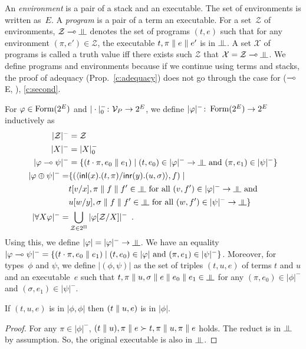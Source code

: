 An \textit{environment} is a pair of a stack and an executable.
The set of environments is written as~$E$.
A \textit{program} is a pair of a term an executable.
For a set~$\mathcal Z$ of environments, $\mathcal Z\limp\bbot$ denotes
the set of programs $(t,e)$ such that
for any environment $(\pi,e')\in \mathcal Z$,
the executable $t,\pi\parallel e \parallel e'$ is in $\bbot$.
A set $\mathcal X$ of programs is called a truth value
iff there exists
such $\mathcal Z$ that $\mathcal X = \mathcal Z\limp \bbot$.
We define programs and environments because if we continue using
terms and stacks, the proof of adequacy (Prop.~\ref{c:adequacy}) does
not go through the case for
($\multimap$E, \textminus), \ref{c:second}.

\renewcommand{\sem}[1]{|{#1}|}
\newcommand{\nsem}[1]{\sem{#1}^-}
\newcommand{\sempair}[1]{\sem{(#1)}}
For $\varphi\in\mathop{\text{Form}}(2^E)$ and $|\cdot|^-_0\colon\mathcal V_P\rightarrow 2^E$,
we define $\nsem{\phi}\colon \form(2^E)\rightarrow
2^E$ inductively as
\begin{align*}
 \nsem{\mathcal Z} &= \mathcal Z \\
 \nsem{X}&= |X|_0^- \\
 \nsem{\phi\limp\psi}&=
 \{(t\cdot\pi, e_0\conc e_1)\mid
 (t,e_0)\in\nsem\phi\rightarrow\bbot \text{ and }(\pi,e_1)\in\nsem\psi\}\\
 \nsem{\phi\oplus\psi}=& \{(\mats x{t}{\pi}y{u}{\sigma}, f)\mid\\ &
 t[v/x],\pi\conc f\conc f'\in\bbot \text{ for all } (v,f')\in\nsem{\phi}\rightarrow\bbot\text{
 and }\\ &
 u[w/y],\sigma\conc f\conc f'\in\bbot \text{ for all } (w,f')\in\nsem{\psi}\rightarrow\bbot\}
 \\
 \nsem{\forall X\phi}=&
 \bigcup_{\mathcal Z\in 2^\Pi} \nsem{\phi[\mathcal Z/X]}\enspace.
\end{align*}
Using this, we define $\sem \phi=\nsem{\phi}\rightarrow\bbot$.
We have an equality
$\nsem{\phi\limp\psi} = \{(t\cdot\pi, e_0\conc e_1)\mid
(t,e_0)\in\sem\phi\text{ and }(\pi,e_1)\in\nsem\psi\}$.
Moreover, for types~$\phi$ and $\psi$, we define $\sempair{\phi,\psi}$
as the set of triples $(t,u,e)$ of terms $t$ and $u$ and an executable~$e$
such
that
$t,\pi\conc u,\sigma\conc e\conc e_0\conc e_1
\in\bbot$ for any $(\pi,e_0)\in\nsem\phi$
and $(\sigma,e_1)\in\nsem\psi$.

\begin{proposition}
 \label{squash}
 If $(t,u,e)$ is in $\sem{\phi,\phi}$ then $(t\parallel u, e)$ is in
 $\sem\phi$.
\end{proposition}
\begin{proof}
 For any $\pi\in\nsem\phi$,
 $(t\parallel u),\pi\parallel e \succ t,\pi\parallel u,\pi\parallel e$ holds.
 The reduct is in $\bbot$ by assumption.
 So, the original executable is also in $\bbot$.
\end{proof}

